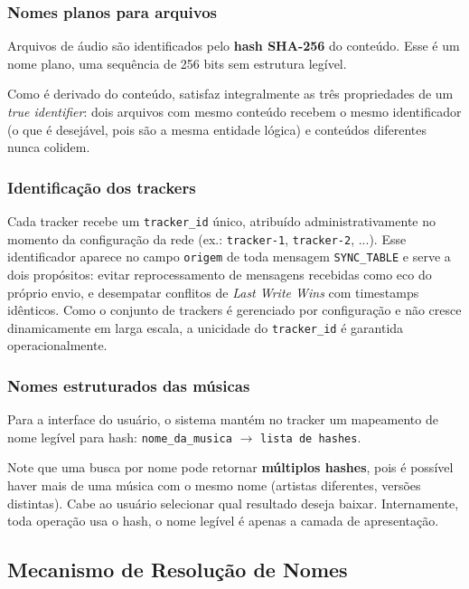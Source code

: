 \documentclass[12pt, a4paper]{article}
\begin{document}
\subsubsection*{Nomes planos para arquivos}

Arquivos de áudio são identificados pelo \textbf{hash SHA-256} do conteúdo. Esse é um nome plano, uma sequência de 256 bits sem estrutura legível. 

Como é derivado do conteúdo, satisfaz integralmente as três propriedades de um \textit{true identifier}: dois arquivos com mesmo conteúdo recebem o mesmo identificador (o que é desejável, pois são a mesma entidade lógica) e conteúdos diferentes nunca colidem.

\subsubsection*{Identificação dos trackers}

Cada tracker recebe um \texttt{tracker\_id} único, atribuído administrativamente no momento da configuração da rede (ex.: \texttt{tracker-1}, \texttt{tracker-2}, ...). Esse identificador aparece no campo \texttt{origem} de toda mensagem \texttt{SYNC\_TABLE} e serve a dois propósitos: evitar reprocessamento de mensagens recebidas como eco do próprio envio, e desempatar conflitos de \textit{Last Write Wins} com timestamps idênticos. Como o conjunto de trackers é gerenciado por configuração e não cresce dinamicamente em larga escala, a unicidade do \texttt{tracker\_id} é garantida operacionalmente.

\subsubsection*{Nomes estruturados das músicas}

Para a interface do usuário, o sistema mantém no tracker um mapeamento de nome legível para hash: \texttt{nome\_da\_musica} $\rightarrow$ \texttt{lista de hashes}.

Note que uma busca por nome pode retornar \textbf{múltiplos hashes}, pois é possível haver mais de uma música com o mesmo nome (artistas diferentes, versões distintas). Cabe ao usuário selecionar qual resultado deseja baixar. Internamente, toda operação usa o hash, o nome legível é apenas a camada de apresentação.

\subsection{Mecanismo de Resolução de Nomes}
\end{document}
